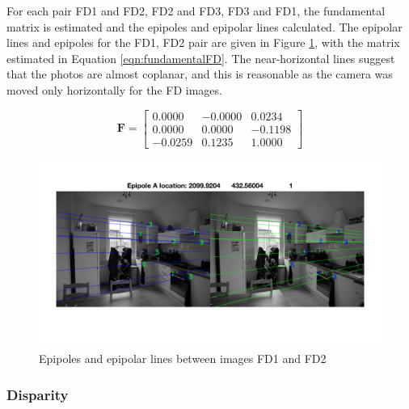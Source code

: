 \documentclass[a4paper, 10pt, conference]{ieeeconf}
\begin{document}

For each pair FD1 and FD2, FD2 and FD3, FD3 and FD1, the fundamental matrix is estimated and the epipoles and epipolar lines calculated. The epipolar lines and epipoles for the FD1, FD2 pair are given in Figure \ref{fig:fdEpipoles}, with the matrix estimated in Equation \ref{eqn:fundamentalFD}. The near-horizontal lines suggest that the photos are almost coplanar, and this is reasonable as the camera was moved only horizontally for the FD images.

\begin{equation} \label{eqn:fundamentalFD}
\textbf{F} = \begin{bmatrix}
     0.0000 & -0.0000 &  0.0234 \\
     0.0000 &  0.0000 & -0.1198 \\
    -0.0259 &  0.1235 &  1.0000
\end{bmatrix}
\end{equation}

\begin{figure}[!ht]
  \centering
  \includegraphics[width=0.75\linewidth]{pic/q2_2_ab_A_0}
  \caption{Epipoles and epipolar lines between images FD1 and FD2}
  \vspace{-0.5cm}
  \label{fig:fdEpipoles}
\end{figure}

\subsubsection{Disparity}
\end{document}
